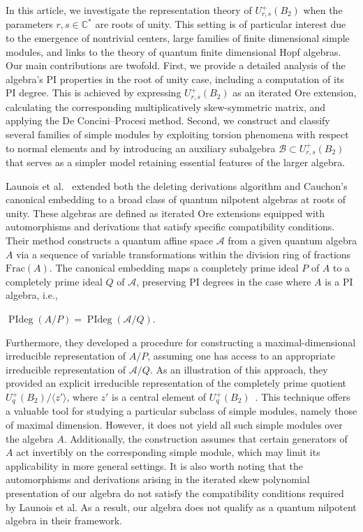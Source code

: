 \documentclass[12 pt,reqno]{amsart}
\numberwithin{equation}{section}
\newcommand{\B}{\mathcal{B}}
\theoremstyle{definition}
\theoremstyle{definition}
\theoremstyle{remark}
\theoremstyle{remark}
\begin{document}
\par In this article, we investigate the representation theory of $ U^+_{r,s}(B_2) $ when the parameters $ r, s \in \mathbb{C}^* $ are roots of unity. This setting is of particular interest due to the emergence of nontrivial centers, large families of finite dimensional simple modules, and links to the theory of quantum finite dimensional Hopf algebras. Our main contributions are twofold. First, we provide a detailed analysis of the algebra's PI properties in the root of unity case, including a computation of its PI degree. This is achieved by expressing $ U^+_{r,s}(B_2) $ as an iterated Ore extension, calculating the corresponding multiplicatively skew-symmetric matrix, and applying the De Concini--Procesi method. Second, we construct and classify several families of simple modules by exploiting torsion phenomena with respect to normal elements and by introducing an auxiliary subalgebra $ \B \subset U^+_{r,s}(B_2) $ that serves as a simpler model retaining essential features of the larger algebra. 
\par Launois et al.~\cite{lau2} extended both the deleting derivations algorithm and Cauchon's canonical embedding to a broad class of quantum nilpotent algebras at roots of unity. These algebras are defined as iterated Ore extensions equipped with automorphisms and derivations that satisfy specific compatibility conditions. Their method constructs a quantum affine space $\mathcal{A}$ from a given quantum algebra $A$ via a sequence of variable transformations within the division ring of fractions $\mathrm{Frac}(A)$. The canonical embedding maps a completely prime ideal $P$ of $A$ to a completely prime ideal $Q$ of $\mathcal{A}$, preserving PI degrees in the case where $A$ is a PI algebra, i.e.,
\begin{center}$
\operatorname{PIdeg}(A/P) = \operatorname{PIdeg}(\mathcal{A}/Q).
$\end{center}
Furthermore, they developed a procedure for constructing a maximal-dimensional irreducible representation of $A/P$, assuming one has access to an appropriate irreducible representation of $\mathcal{A}/Q$. As an illustration of this approach, they provided an explicit irreducible representation of the completely prime quotient $U_q^+(B_2)/\langle z' \rangle$, where $z'$ is a central element of $U_q^+(B_2)$~\cite[Example 5.1]{lau2}. This technique offers a valuable tool for studying a particular subclass of simple modules, namely those of maximal dimension. However, it does not yield all such simple modules over the algebra $A$. Additionally, the construction assumes that certain generators of $A$ act invertibly on the corresponding simple module, which may limit its applicability in more general settings. It is also worth noting that the automorphisms and derivations arising in the iterated skew polynomial presentation of our algebra do not satisfy the compatibility conditions required by Launois et al. As a result, our algebra does not qualify as a quantum nilpotent algebra in their framework.
\end{document}
